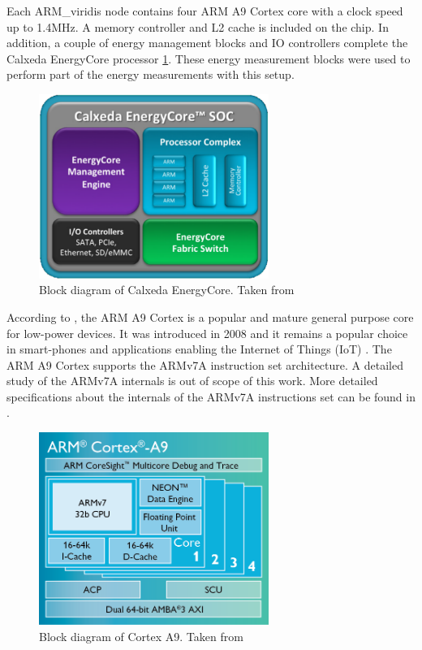 Each ARM\_viridis node contains four ARM A9 Cortex core with a clock speed up
to 1.4MHz. A memory controller and L2 cache is included on the chip. In
addition, a couple of energy management blocks and IO controllers complete the
Calxeda EnergyCore processor \ref{fig:calxedaSOC}. These energy measurement
blocks were used to perform part of the energy measurements with this setup.


\begin{figure}[h!]
  \centering
    \includegraphics[width=75mm]{"img/calxedaSOC"}
    \caption{Block diagram of Calxeda EnergyCore. Taken from \cite{VIRIDIS}}
    \label{fig:calxedaSOC}
\end{figure}


According to \cite{CORTEXA9}, the ARM A9 Cortex is a popular and mature general
purpose core for low-power devices. It was introduced in 2008 and it remains a
popular choice in smart-phones and applications enabling the Internet of Things
(IoT) \cite{CORTEXA9}. The ARM A9 Cortex supports the ARMv7A 
instruction set architecture. A detailed study of the ARMv7A internals is out
of scope of this work. More detailed specifications about the
internals of the ARMv7A instructions set can be found in \cite{CORTEXA9}.


\begin{figure}[h!]
  \centering
    \includegraphics[width=75mm]{"img/cortexA9"}
    \caption{Block diagram of Cortex A9. Taken from \cite{CORTEXA9}}
    \label{fig:cortexA9}
\end{figure}


